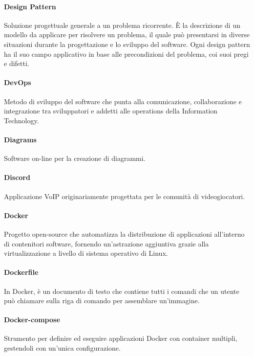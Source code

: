 \documentclass[]{article}
\begin{document}
	\paragraph*{Design Pattern}
	Soluzione progettuale generale a un problema ricorrente. È la descrizione di un modello da applicare per risolvere un problema, il quale può presentarsi in diverse situazioni durante la progettazione e lo sviluppo del software. Ogni design pattern ha il suo campo applicativo in base alle precondizioni del problema, coi suoi pregi e difetti.
	
	\paragraph*{DevOps}
	Metodo di sviluppo del software che punta alla comunicazione, collaborazione e integrazione tra sviluppatori e addetti alle operations della Information Technology.
	
	\paragraph*{Diagrams}
	Software on-line per la creazione di diagrammi.
	
	\paragraph*{Discord}
	Applicazione VoIP originariamente progettata per le comunità di videogiocatori.
	
	\paragraph*{Docker}
	Progetto open-source che automatizza la distribuzione di applicazioni all'interno di contenitori software, fornendo un'astrazione aggiuntiva grazie alla virtualizzazione a livello di sistema operativo di Linux.
	
	\paragraph*{Dockerfile}
	In Docker, è un documento di testo che contiene tutti i comandi che un utente può chiamare sulla riga di comando per assemblare un'immagine.
	
	\paragraph*{Docker-compose}
	Strumento per definire ed eseguire applicazioni Docker con container multipli, gestendoli con un'unica configurazione.
	
\end{document}
